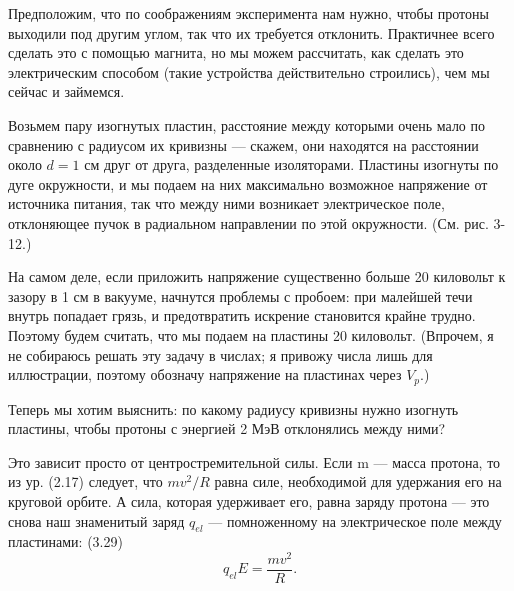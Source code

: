 \documentclass[10pt,oneside]{article}
\begin{document}
Предположим, что по соображениям эксперимента нам нужно, чтобы протоны выходили под другим углом, так что их требуется отклонить. Практичнее всего сделать это с помощью магнита, но мы можем рассчитать, как сделать это электрическим способом (такие устройства действительно строились), чем мы сейчас и займемся.\par

Возьмем пару изогнутых пластин, расстояние между которыми очень мало по сравнению с радиусом их кривизны --- скажем, они находятся на расстоянии около \(d = 1\) см друг от друга, разделенные изоляторами. Пластины изогнуты по дуге окружности, и мы подаем на них максимально возможное напряжение от источника питания, так что между ними возникает электрическое поле, отклоняющее пучок в радиальном направлении по этой окружности. (См. рис. 3-12.)\par

На самом деле, если приложить напряжение существенно больше 20 киловольт к зазору в 1 см в вакууме, начнутся проблемы с пробоем: при малейшей течи внутрь попадает грязь, и предотвратить искрение становится крайне трудно. Поэтому будем считать, что мы подаем на пластины 20 киловольт. (Впрочем, я не собираюсь решать эту задачу в числах; я привожу числа лишь для иллюстрации, поэтому обозначу напряжение на пластинах через \(V_p\).)\par

Теперь мы хотим выяснить: по какому радиусу кривизны нужно изогнуть пластины, чтобы протоны с энергией 2 МэВ отклонялись между ними?\par

Это зависит просто от центростремительной силы. Если m --- масса протона, то из ур. (2.17) следует, что \(m v^2 / R\) равна силе, необходимой для удержания его на круговой орбите. А сила, которая удерживает его, равна заряду протона --- это снова наш знаменитый заряд \(q_{el}\) --- помноженному на электрическое поле между пластинами: (3.29) \[q_{el} E = \frac{m v^2}{R}.\]\par
\end{document}
